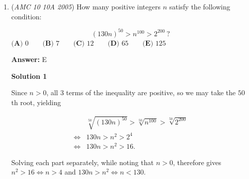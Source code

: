 \begin{enumerate}
$\textbf{(A) } \frac{1}{3}\pi+\frac{\sqrt{3}}{2}\qquad \textbf{(B) } \frac{2}{3}\pi\qquad \textbf{(C) } \frac{2}{3}\pi+\frac{\sqrt{3}}{4}\qquad \textbf{(D) } \frac{2}{3}\pi+\frac{\sqrt{3}}{3}\qquad \textbf{(E) } \frac{2}{3}\pi+\frac{\sqrt{3}}{2}$

 \textbf{Answer: }B



\textbf{Solution}

The area of the \textit{trefoil} is equal to the area of an equilateral triangle with side length $2$, plus the area of $4$ segments. Each segment has area equal to that of a $60^{\circ}$ sector with radius $\frac{2}{2} = 1$, minus the area of an equilateral triangle with side length $1$.

 As there are $4$ segments, the area of the equilateral triangle with side length $1$ will be multiplied by $4$, and this is equivalent to the area of an equilateral triangle with side length $1 \cdot \sqrt{4} = 2$ (since the area scale factor is the square of the length scale factor). Accordingly, the area of the equilateral triangle with side length $2$ will exactly cancel out, and we are left only with $4$ times the area of a $60^{\circ}$ sector with radius $1$. 

 Thus the answer is $4\cdot\frac{60}{360}\cdot\pi\cdot 1^2 = \frac{4}{6}\cdot\pi = \boxed{\textbf{(B) } \frac{2}{3}\pi}$.

 


	\item (\textit{AMC 10 10A 2005}) How many positive integers $n$ satisfy the following condition:


 
 \[\left(130n\right)^{50} > n^{100} > 2^{200} \ \text{?}\]
$\textbf{(A) } 0\qquad \textbf{(B) } 7\qquad \textbf{(C) } 12\qquad \textbf{(D) } 65\qquad \textbf{(E) } 125$

 \textbf{Answer: }E



\textbf{Solution 1}

Since $n > 0$, all $3$ terms of the inequality are positive, so we may take the $50$th root, yielding

 
 \begin{align*}&\sqrt[50]{(130n)^{50}} > \sqrt[50]{n^{100}} > \sqrt[50]{2^{200}} \\ \iff &130n > n^2 > 2^4 \\ \iff &130n > n^2 > 16.\end{align*}


 Solving each part separately, while noting that $n > 0$, therefore gives $n^2 > 16 \iff n > 4$ and $130n > n^2 \iff n < 130$. 


\end{enumerate}
